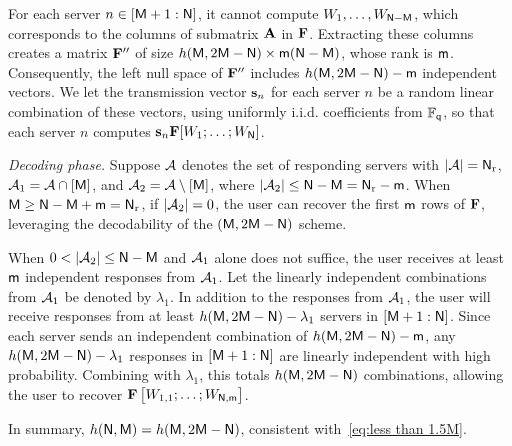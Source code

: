 \documentclass[conference,letterpaper]{IEEEtran}
\begin{document}
For each server $n \in [{\sf M}+1 : {\sf N}]$, it cannot compute $W_1, \ldots, W_{{\sf N} - {\sf M}}$, which corresponds to the columns of submatrix ${\bf A}$ in ${\bf F}$. Extracting these columns creates a matrix ${\bf F}''$ of size $h({\sf M}, 2{\sf M} - {\sf N}) \times {\sf m} ({\sf N} - {\sf M})$, whose rank is ${\sf m}$. Consequently, the left null space of ${\bf F}''$ includes $h({\sf M}, 2{\sf M} - {\sf N}) - {\sf m}$ independent vectors. We let the transmission vector ${\bf s}_n$ for each server $n$ be a random linear combination of these vectors, using uniformly i.i.d. coefficients from $\mathbb{F}_{{\sf q}}$, so that each server $n$ computes ${\bf s}_n {\bf F} [W_1; \ldots; W_{{\sf N}}]$.

{\it Decoding phase.} Suppose ${\cal A}$ denotes the set of responding servers with $|{\cal A}| = {\sf N}_{\rm r}$, ${\cal A}_1 = {\cal A} \cap [{\sf M}]$, and ${\cal A}_2 = {\cal A} \setminus [{\sf M}]$, where $|{\cal A}_2| \leq {\sf N} - {\sf M} = {\sf N}_{\rm r} - {\sf m}$. When ${\sf M} \geq {\sf N} - {\sf M} + {\sf m} = {\sf N}_{\rm r}$, if $|{\cal A}_2| = 0$, the user can recover the first ${\sf m}$ rows of ${\bf F}$, leveraging the decodability of the $({\sf M}, 2{\sf M} - {\sf N})$ scheme.

When $0 < |{\cal A}_2| \leq {\sf N} - {\sf M}$ and ${\cal A}_1$ alone does not suffice, the user receives at least ${\sf m}$ independent responses from ${\cal A}_1$. Let the linearly independent combinations from ${\cal A}_1$ be denoted by $\lambda_1$. In addition to the responses from ${\cal A}_1$, the user will receive responses from at least $h({\sf M}, 2{\sf M} - {\sf N}) - \lambda_1$ servers in $[{\sf M}+1 : {\sf N}]$. Since each server sends an independent combination of $h({\sf M}, 2{\sf M} - {\sf N}) - {\sf m}$, any $h({\sf M}, 2{\sf M} - {\sf N}) - \lambda_1$ responses in $[{\sf M}+1 : {\sf N}]$ are linearly independent with high probability. Combining with $\lambda_1$, this totals $h({\sf M}, 2{\sf M} - {\sf N})$ combinations, allowing the user to recover ${\bf F} \begin{bmatrix} W_{1,1}; \ldots; W_{{\sf N}, {\sf m}} \end{bmatrix}$.

In summary, $h({\sf N}, {\sf M}) = h({\sf M}, 2{\sf M} - {\sf N})$, consistent with~\eqref{eq:less than 1.5M}.



\end{document}
